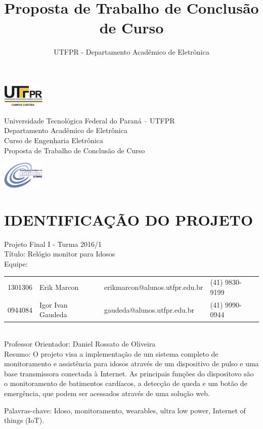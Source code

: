 \documentclass[a4paper]{article}
\title{Proposta de Trabalho de Conclusão de Curso}
\author{UTFPR - Departamento Acadêmico de Eletrônica}
\date{\the\year}
\begin{document}
\noindent
\includegraphics[width=0.15\textwidth]{figuras/UTFPR.png}
\begin{minipage}[b]{0.7\textwidth}
\centering
\Large{
Universidade Tecnológica Federal do Paraná – UTFPR\\
Departamento Acadêmico de Eletrônica\\
Curso de Engenharia Eletrônica \\
Proposta de Trabalho de Conclusão de Curso}
\end{minipage}
\includegraphics[width=0.15\textwidth]{figuras/daeln.jpg}

\section{IDENTIFICAÇÃO DO PROJETO}

Projeto Final I - Turma 2016/1 \\

Título: Relógio monitor para Idosos \\

Equipe:
\newline
	
\begin{tabular}{llll}
	1301306 & Erik Marcon & erikmarcon@alunos.utfpr.edu.br & (41) 9830-9199 \\
	0944084 & Igor Ivan Gaudeda & gaudeda@alunos.utfpr.edu.br & (41) 9990-0944
\end{tabular} \\

Professor Orientador: Daniel Rossato de Oliveira \\

Resumo: O projeto visa a implementação de um sistema completo de monitoramento e assistência para idosos através de um dispositivo de pulso e uma base transmissora conectada à Internet. As principais funções do dispositovo são o monitoramento de batimentos cardíacos, a detecção de queda e um botão de emergência, que podem ser acessados através de uma solução web.

Palavras-chave: Idoso, monitoramento, wearables, ultra low power, Internet of things (IoT).
\end{document}
